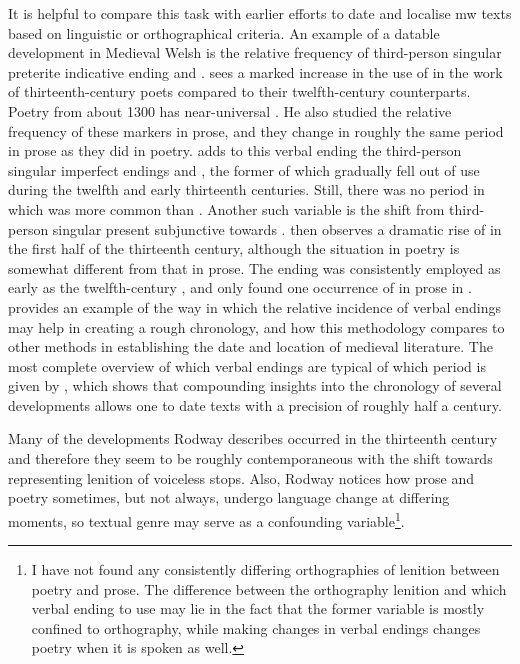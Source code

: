 It is helpful to compare this task with earlier efforts to date and localise \gls{mw} texts based on linguistic or orthographical criteria. An example of a datable development in Medieval Welsh is the relative frequency of third-person singular preterite indicative ending  and . \Textcite{Rod_Datable98} sees a marked increase in the use of  in the work of thirteenth-century poets compared to their twelfth-century counterparts. Poetry from about 1300 has near-universal . He also studied the relative frequency of these markers in prose, and they change in roughly the same period in prose as they did in poetry. \Textcite[68--71]{Rod_Two03} adds to this verbal ending the third-person singular imperfect endings  and \ei, the former of which gradually fell out of use during the twelfth and early thirteenth centuries. Still, there was no period in which  was more common than \ei. Another such variable is the shift from third-person singular present subjunctive  towards . \Textcite[71--73]{Rod_Two03} then observes a dramatic rise of  in the first half of the thirteenth century, although the situation in poetry is somewhat different from that in prose. The ending  was consistently employed as early as the twelfth-century , and \textcite[73]{Rod_Two03} only found one occurrence of  in prose in . \Textcite{Rod_Where07} provides an example of the way in which the relative incidence of verbal endings may help in creating a rough chronology, and how this methodology compares to other methods in establishing the date and location of medieval literature. The most complete overview of which verbal endings are typical of which period is given by \textcite[166]{rodway_dating_2013}, which shows that compounding insights into the chronology of several developments allows one to date texts with a precision of roughly half a century.

Many of the developments Rodway describes occurred in the thirteenth century and therefore they seem to be roughly contemporaneous with the shift towards representing lenition of voiceless stops. Also, Rodway notices how prose and poetry sometimes, but not always, undergo language change at differing moments, so textual genre may serve as a confounding variable\footnote{I have not found any consistently differing orthographies of lenition between poetry and prose. The difference between the orthography lenition and which verbal ending to use may lie in the fact that the former variable is mostly confined to orthography, while making changes in verbal endings changes poetry when it is spoken as well.}.

